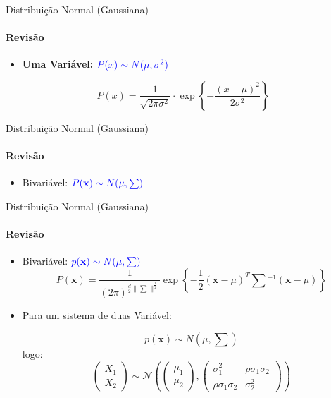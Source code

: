 \documentclass[aspectratio=169]{beamer}
\begin{document}
\begin{frame}{Distribuição Normal (Gaussiana)}
    \framesubtitle{Revisão}  
    \begin{itemize}
        \item \textbf{Uma Variável:} $\color{blue}{P(x) \sim N(\mu, \sigma^2)}$
    \end{itemize}
    \begin{block}{}
        \begin{equation*}
            P(x) = \dfrac{1}{\sqrt{2\pi\sigma^2}}\cdot 
        \exp\left\{-\frac{(x-\mu)^2}{2\sigma^2}\right\}
        \end{equation*}
    \end{block}
    \centering
    
\end{frame}


\begin{frame}{Distribuição Normal (Gaussiana)}
    \framesubtitle{Revisão}
    \begin{itemize}
        \item Bivariável: $\color{blue}{P(\mathbf{x}) \sim N(\mu, \textstyle\sum)}$
    \end{itemize}
    \centering
    
\end{frame}



\begin{frame}{Distribuição Normal (Gaussiana)}
    \framesubtitle{Revisão}
    \begin{itemize}
        \item Bivariável: $\color{blue}{p(\mathbf{x}) \sim N(\mu, \textstyle\sum)}$
    \begin{equation*}
        P(\mathbf{x}) = \frac{1}{(2\pi)^{\frac{d}{2}\|\textstyle\sum\|^{\frac{1}{2}}}}\exp\left\{-\frac{1}{2} (\mathbf{x}-\mu)^T\textstyle\sum{}^{-1}(\mathbf{x}-\mu)\right\}
    \end{equation*}
    
    \item Para um sistema de duas Variável:
    
    \begin{equation*}
        p(\mathbf{x}) \sim N(\mu, \textstyle\sum)
    \end{equation*}
    logo:     
    \begin{equation*}
        \begin{pmatrix}
            X_1 \\
            X_2
        \end{pmatrix}  \sim \mathcal{N} \left( \begin{pmatrix}
            \mu_1 \\
            \mu_2
        \end{pmatrix} , \begin{pmatrix}
            \sigma^2_1 &  \rho \sigma_1 \sigma_2 \\
            \rho \sigma_1 \sigma_2 &  \sigma^2_2
        \end{pmatrix} \right)
    \end{equation*}
    \end{itemize}
\end{frame}
\end{document}
